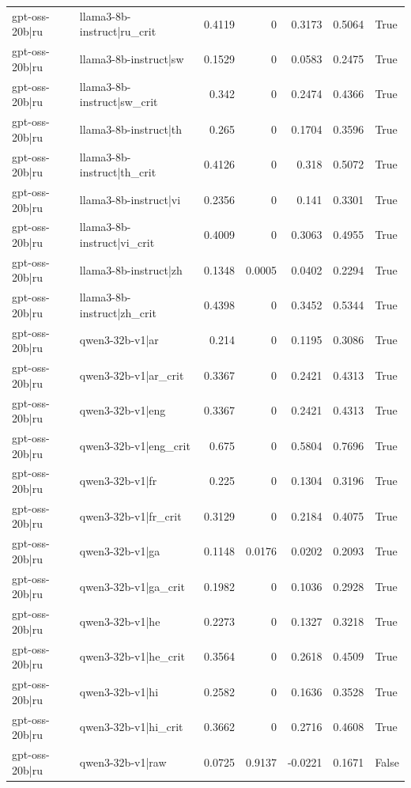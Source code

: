 \begin{table}
\begin{tabular}{l l r r r r l}
gpt-oss-20b|ru & llama3-8b-instruct|ru_crit & 0.4119 & 0 & 0.3173 & 0.5064 & True \\
gpt-oss-20b|ru & llama3-8b-instruct|sw & 0.1529 & 0 & 0.0583 & 0.2475 & True \\
gpt-oss-20b|ru & llama3-8b-instruct|sw_crit & 0.342 & 0 & 0.2474 & 0.4366 & True \\
gpt-oss-20b|ru & llama3-8b-instruct|th & 0.265 & 0 & 0.1704 & 0.3596 & True \\
gpt-oss-20b|ru & llama3-8b-instruct|th_crit & 0.4126 & 0 & 0.318 & 0.5072 & True \\
gpt-oss-20b|ru & llama3-8b-instruct|vi & 0.2356 & 0 & 0.141 & 0.3301 & True \\
gpt-oss-20b|ru & llama3-8b-instruct|vi_crit & 0.4009 & 0 & 0.3063 & 0.4955 & True \\
gpt-oss-20b|ru & llama3-8b-instruct|zh & 0.1348 & 0.0005 & 0.0402 & 0.2294 & True \\
gpt-oss-20b|ru & llama3-8b-instruct|zh_crit & 0.4398 & 0 & 0.3452 & 0.5344 & True \\
gpt-oss-20b|ru & qwen3-32b-v1|ar & 0.214 & 0 & 0.1195 & 0.3086 & True \\
gpt-oss-20b|ru & qwen3-32b-v1|ar_crit & 0.3367 & 0 & 0.2421 & 0.4313 & True \\
gpt-oss-20b|ru & qwen3-32b-v1|eng & 0.3367 & 0 & 0.2421 & 0.4313 & True \\
gpt-oss-20b|ru & qwen3-32b-v1|eng_crit & 0.675 & 0 & 0.5804 & 0.7696 & True \\
gpt-oss-20b|ru & qwen3-32b-v1|fr & 0.225 & 0 & 0.1304 & 0.3196 & True \\
gpt-oss-20b|ru & qwen3-32b-v1|fr_crit & 0.3129 & 0 & 0.2184 & 0.4075 & True \\
gpt-oss-20b|ru & qwen3-32b-v1|ga & 0.1148 & 0.0176 & 0.0202 & 0.2093 & True \\
gpt-oss-20b|ru & qwen3-32b-v1|ga_crit & 0.1982 & 0 & 0.1036 & 0.2928 & True \\
gpt-oss-20b|ru & qwen3-32b-v1|he & 0.2273 & 0 & 0.1327 & 0.3218 & True \\
gpt-oss-20b|ru & qwen3-32b-v1|he_crit & 0.3564 & 0 & 0.2618 & 0.4509 & True \\
gpt-oss-20b|ru & qwen3-32b-v1|hi & 0.2582 & 0 & 0.1636 & 0.3528 & True \\
gpt-oss-20b|ru & qwen3-32b-v1|hi_crit & 0.3662 & 0 & 0.2716 & 0.4608 & True \\
gpt-oss-20b|ru & qwen3-32b-v1|raw & 0.0725 & 0.9137 & -0.0221 & 0.1671 & False \\

\end{tabular}
\end{table}
